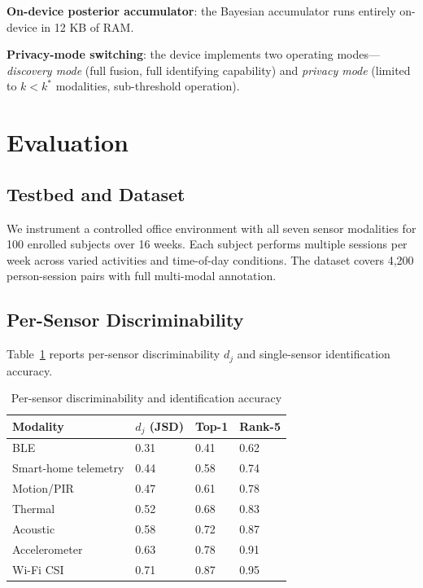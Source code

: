 \documentclass[sigconf,nonacm]{acmart}
\begin{document}
\textbf{On-device posterior accumulator}: the Bayesian
accumulator runs entirely on-device in 12 KB of RAM.

\textbf{Privacy-mode switching}: the device implements two
operating modes---\emph{discovery mode} (full fusion, full
identifying capability) and \emph{privacy mode} (limited to
$k < k^*$ modalities, sub-threshold operation).

\section{Evaluation}

\subsection{Testbed and Dataset}

We instrument a controlled office environment with all seven
sensor modalities for 100 enrolled subjects over 16 weeks. Each
subject performs multiple sessions per week across varied
activities and time-of-day conditions. The dataset covers 4,200
person-session pairs with full multi-modal annotation.

\subsection{Per-Sensor Discriminability}

Table~\ref{tab:discrim} reports per-sensor discriminability
$d_j$ and single-sensor identification accuracy.

\begin{table}[h]
\caption{Per-sensor discriminability and identification accuracy}
\label{tab:discrim}
\small
\begin{tabularx}{\columnwidth}{@{}p{2.2cm}X X X@{}}
\toprule
\textbf{Modality} & \textbf{$d_j$ (JSD)} & \textbf{Top-1} & \textbf{Rank-5} \\
\midrule
BLE               & 0.31 & 0.41 & 0.62 \\
Smart-home telemetry & 0.44 & 0.58 & 0.74 \\
Motion/PIR        & 0.47 & 0.61 & 0.78 \\
Thermal           & 0.52 & 0.68 & 0.83 \\
Acoustic          & 0.58 & 0.72 & 0.87 \\
Accelerometer     & 0.63 & 0.78 & 0.91 \\
Wi-Fi CSI         & 0.71 & 0.87 & 0.95 \\
\bottomrule
\end{tabularx}
\end{table}
\end{document}

